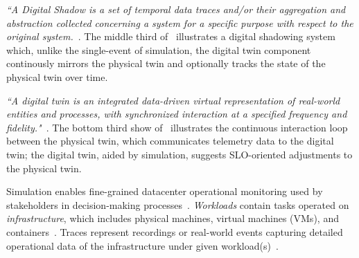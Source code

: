 \textit{``A Digital Shadow is a set of temporal data traces and/or their aggregation and abstraction collected concerning a system for a specific purpose with respect to the original system.}~\cite{Braun2023_DigitalShadowDefinition}. The middle third of~ illustrates a digital shadowing system which, unlike the single-event of simulation, the digital twin component continously mirrors the physical twin and optionally tracks the state of the physical twin over time.


\textit{``A digital twin is an integrated data-driven virtual representation of real-world entities and processes, with synchronized interaction at a specified frequency and fidelity."}~\cite{DTC_Digital_Twin_Definition_2025}. The bottom third show of~ illustrates the continuous interaction loop between the physical twin, which communicates telemetry data to the digital twin; the digital twin, aided by simulation, suggests SLO-oriented adjustments to the physical twin.

Simulation enables fine-grained datacenter operational monitoring used by stakeholders in decision-making processes~\cite{nicolae5377101m3sa}. \textit{Workloads} contain tasks operated on \textit{infrastructure}, which includes physical machines, virtual machines (VMs), and containers~\cite{nicolae5377101m3sa}. Traces represent recordings or real-world events capturing detailed operational data of the infrastructure under given workload(s)~\cite{nicolae5377101m3sa}.







